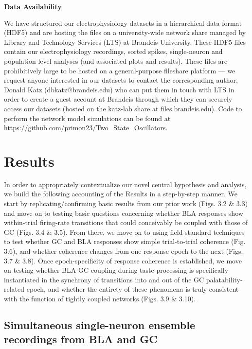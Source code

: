 \begin{refsection}
\smallskip
\noindent\textbf{Data Availability}\par
\noindent We have structured our electrophysiology datasets in a hierarchical data format (HDF5) and are hosting the files on a university-wide network share managed by Library and Technology Services (LTS) at Brandeis University. These HDF5 files contain our electrophysiology recordings, sorted spikes, single-neuron and population-level analyses (and associated plots and results). These files are prohibitively large to be hosted on a general-purpose fileshare platform --- we request anyone interested in our datasets to contact the corresponding author, Donald Katz (dbkatz@brandeis.edu) who can put them in touch with LTS in order to create a guest account at Brandeis through which they can securely access our datasets (hosted on the katz-lab share at files.brandeis.edu). Code to perform the network model simulations can be found at \url{https://github.com/primon23/Two_State_Oscillators}.

\section{Results}
In order to appropriately contextualize our novel central hypothesis and analysis, we build the following accounting of the Results in a step-by-step manner. We start by replicating/confirming basic results from our prior work (Figs. 3.2 \& 3.3) and move on to testing basic questions concerning whether BLA responses show within-trial firing-rate transitions that could conceivably be coupled with those of GC (Figs. 3.4 \& 3.5). From there, we move on to using field-standard techniques to test whether GC and BLA responses show simple trial-to-trial coherence (Fig. 3.6), and whether coherence changes from one response epoch to the next (Figs. 3.7 \& 3.8). Once epoch-specificity of response coherence is established, we move on testing whether BLA-GC coupling during taste processing is specifically instantiated in the synchrony of transitions into and out of the GC palatability-related epoch, and whether the entirety of these phenomena is truly consistent with the function of tightly coupled networks (Figs. 3.9 \& 3.10).

\subsection{Simultaneous single-neuron ensemble recordings from BLA and GC}


\end{refsection}
